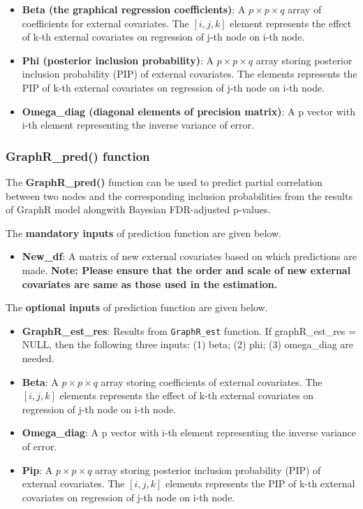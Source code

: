 \documentclass[
]{article}
\providecommand{\tightlist}{%
  \setlength{\itemsep}{0pt}\setlength{\parskip}{0pt}}
\begin{document}
\begin{itemize}
\item
  \textbf{Beta (the graphical regression coefficients)}: A
  \(p \times p \times q\) array of coefficients for external covariates.
  The \([i,j,k]\) element represents the effect of k-th external
  covariates on regression of j-th node on i-th node.
\item
  \textbf{Phi (posterior inclusion probability)}: A
  \(p \times p \times q\) array storing posterior inclusion probability
  (PIP) of external covariates. The \eqn{[i,j,k]} elements represents
  the PIP of k-th external covariates on regression of j-th node on i-th
  node.
\item
  \textbf{Omega\_diag (diagonal elements of precision matrix)}: A p
  vector with i-th element representing the inverse variance of error.
\end{itemize}

\hypertarget{graphr_pred-function}{%
\subsubsection{GraphR\_pred() function}\label{graphr_pred-function}}

The \textbf{GraphR\_pred()} function can be used to predict partial
correlation between two nodes and the corresponding inclusion
probabilities from the results of GraphR model alongwith Bayesian
FDR-adjusted p-values.

The \textbf{mandatory inputs} of prediction function are given below.

\begin{itemize}
\tightlist
\item
  \textbf{New\_df}: A matrix of new external covariates based on which
  predictions are made. \textbf{Note: Please ensure that the order and
  scale of new external covariates are same as those used in the
  estimation.}
\end{itemize}

The \textbf{optional inputs} of prediction function are given below.

\begin{itemize}
\item
  \textbf{GraphR\_est\_res}: Results from \texttt{GraphR\_est} function.
  If graphR\_est\_res = NULL, then the following three inputs: (1) beta;
  (2) phi; (3) omega\_diag are needed.
\item
  \textbf{Beta}: A \(p \times p \times q\) array storing coefficients of
  external covariates. The \([i,j,k]\) elements represents the effect of
  k-th external covariates on regression of j-th node on i-th node.
\item
  \textbf{Omega\_diag}: A p vector with i-th element representing the
  inverse variance of error.
\item
  \textbf{Pip}: A \(p \times p \times q\) array storing posterior
  inclusion probability (PIP) of external covariates. The \([i,j,k]\)
  elements represents the PIP of k-th external covariates on regression
  of j-th node on i-th node.
\end{itemize}
\end{document}
